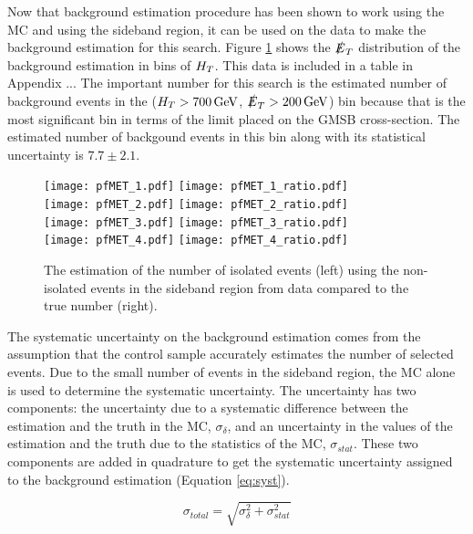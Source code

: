 Now that background estimation procedure has been shown to work using the MC and
using the sideband region, it can be used on the data to make the background
estimation for this search. Figure \ref{fig:Bkgd_Est} shows the $\slashed{E}_{T}$
distribution of the background estimation in bins of $H_{T}$. This data is
included in a table in Appendix ... The important number for this search is the
estimated number of background events in the ($H_{T}>700\, \mathrm{GeV}$, 
$\slashed{E}_{T}>200\, \mathrm{GeV}$) bin because that is the most significant bin in terms of
the limit placed on the GMSB cross-section. The estimated number of backgound
events in this bin along with its statistical uncertainty is $7.7\pm2.1$. \\

\begin{figure}
\texttt{[image: pfMET\_1.pdf]}
\texttt{[image: pfMET\_1\_ratio.pdf]}\\
\texttt{[image: pfMET\_2.pdf]}
\texttt{[image: pfMET\_2\_ratio.pdf]}\\
\texttt{[image: pfMET\_3.pdf]}
\texttt{[image: pfMET\_3\_ratio.pdf]}\\
\texttt{[image: pfMET\_4.pdf]}
\texttt{[image: pfMET\_4\_ratio.pdf]}\\
\caption{The estimation of the number of isolated events (left) using the
non-isolated events in the sideband region from data compared to the true number
(right).}
\label{fig:Bkgd_Est}
\end{figure}

The systematic uncertainty on the background estimation comes from the assumption 
that the control sample accurately estimates the number of selected events. Due
to the small number of events in the sideband region, the MC alone is used to
determine the systematic uncertainty. The uncertainty has two components: the
uncertainty due to a systematic difference between the estimation and the truth 
in the MC, $\sigma_{\delta}$, and an uncertainty in the values of the estimation 
and the truth due to the statistics of the MC, $\sigma_{stat}$. These two 
components are added in quadrature to get the systematic uncertainty assigned to 
the background estimation (Equation \ref{eq:syst}).

\begin{equation}
\sigma_{total} = \sqrt{\sigma_{\delta}^{2} + \sigma_{stat}^{2}}
\label{eq:syst}
\end{equation}

